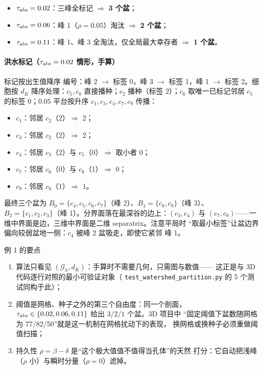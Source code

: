 \documentclass[UTF8,zihao=-4]{ctexart}
\begin{document}
\begin{itemize}
  \item $\tau_{\rm abs}=0.02$：三峰全标记 $\Rightarrow$ \textbf{3 个盆}；
  \item $\tau_{\rm abs}=0.06$：峰 1（$\rho=0.05$）淘汰 $\Rightarrow$
  \textbf{2 个盆}；
  \item $\tau_{\rm abs}=0.11$：峰 1、峰 3 全淘汰，仅全局最大幸存者
  $\Rightarrow$ \textbf{1 个盆}。
\end{itemize}

\paragraph{洪水标记（$\tau_{\rm abs}=0.02$ 情形，手算）} 标记按出生值降序
编号：峰 2 $\to$ 标签 0，峰 3 $\to$ 标签 1，峰 1 $\to$ 标签 2。细胞按 $d_K$
降序处理：$c_5,c_8$ 直接播种；$c_2$ 播种（标签 2）；$c_6$ 取唯一已标记邻居
$c_5$ 的标签 0；$0.05$ 平台按升序 $c_1,c_3,c_4,c_7,c_9$ 传播：
\begin{itemize}
  \item $c_1$：邻居 $c_2$（2）$\Rightarrow$ 2；
  \item $c_3$：邻居 $c_2$（2）$\Rightarrow$ 2；
  \item $c_4$：邻居 $c_3$（2）与 $c_5$（0）$\Rightarrow$ 取小者 0；
  \item $c_7$：邻居 $c_6$（0）与 $c_8$（1）$\Rightarrow$ 0；
  \item $c_9$：邻居 $c_8$（1）$\Rightarrow$ 1。
\end{itemize}
最终三个盆为 $B_0=\{c_4,c_5,c_6,c_7\}$（峰 2）、$B_1=\{c_8,c_9\}$（峰 3）、
$B_2=\{c_1,c_2,c_3\}$（峰 1）。分界面落在最深谷的边上：$(c_3,c_4)$ 与
$(c_7,c_8)$——一维中界面是边，三维中界面是二维 separatrix。注意平局时
``取最小标签''让盆边界偏向较弱盆地一侧：$c_4$ 被峰 2 盆吸走，即使它紧邻
峰 1。

\begin{keybox}{例 1 的要点}
\begin{enumerate}
  \item 算法只看见 $(\mathcal G_h,d_K)$：手算时不需要几何，只需图与数值——
  这正是与 3D 代码逐行对照的最小可验证对象（
  \texttt{test\_watershed\_partition.py} 的 5 个测试同构于此）；
  \item 阈值是网格、种子之外的第三个自由度：同一个剖面，
  $\tau_{\rm abs}\in\{0.02,0.06,0.11\}$ 给出 $3/2/1$ 个盆。3D 项目中
  ``固定阈值下盆数随网格为 77/82/50''就是这一机制在网格扰动下的表现，
  换网格或换种子必须重做阈值扫描；
  \item 持久性 $\rho=\beta-\delta$ 是``这个极大值值不值得当孔体''的天然
  打分：它自动把浅峰（$\rho$ 小）与瞬时分量（$\rho=0$）滤掉。
\end{enumerate}
\end{keybox}
\end{document}
